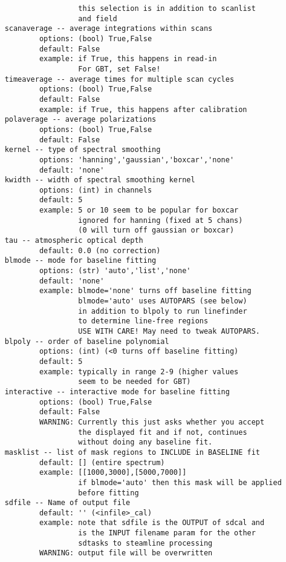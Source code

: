 \begin{itemize}
\begin{verbatim}
                     this selection is in addition to scanlist
                     and field
    scanaverage -- average integrations within scans
            options: (bool) True,False
            default: False
            example: if True, this happens in read-in
                     For GBT, set False!
    timeaverage -- average times for multiple scan cycles
            options: (bool) True,False
            default: False
            example: if True, this happens after calibration
    polaverage -- average polarizations
            options: (bool) True,False
            default: False
    kernel -- type of spectral smoothing
            options: 'hanning','gaussian','boxcar','none'
            default: 'none'
    kwidth -- width of spectral smoothing kernel
            options: (int) in channels 
            default: 5
            example: 5 or 10 seem to be popular for boxcar
                     ignored for hanning (fixed at 5 chans)
                     (0 will turn off gaussian or boxcar)
    tau -- atmospheric optical depth
            default: 0.0 (no correction)
    blmode -- mode for baseline fitting
            options: (str) 'auto','list','none'
            default: 'none'
            example: blmode='none' turns off baseline fitting
                     blmode='auto' uses AUTOPARS (see below)
                     in addition to blpoly to run linefinder
                     to determine line-free regions
                     USE WITH CARE! May need to tweak AUTOPARS.
    blpoly -- order of baseline polynomial
            options: (int) (<0 turns off baseline fitting)
            default: 5
            example: typically in range 2-9 (higher values
                     seem to be needed for GBT)
    interactive -- interactive mode for baseline fitting
            options: (bool) True,False
            default: False
            WARNING: Currently this just asks whether you accept
                     the displayed fit and if not, continues
                     without doing any baseline fit.
    masklist -- list of mask regions to INCLUDE in BASELINE fit
            default: [] (entire spectrum)
            example: [[1000,3000],[5000,7000]]
                     if blmode='auto' then this mask will be applied
                     before fitting
    sdfile -- Name of output file
            default: '' (<infile>_cal)
            example: note that sdfile is the OUTPUT of sdcal and
                     is the INPUT filename param for the other
                     sdtasks to steamline processing
            WARNING: output file will be overwritten

\end{verbatim}
\end{itemize}
